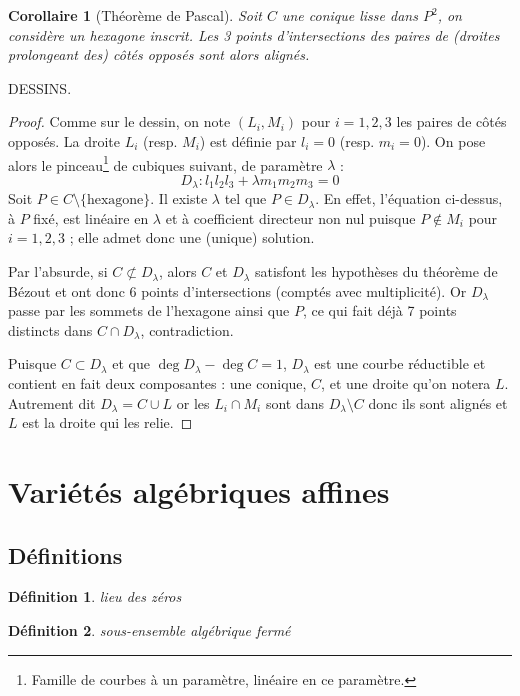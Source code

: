 \documentclass[a4paper, 11pt]{article}
\newtheorem{corollaire}[théorème]{Corollaire}
\theoremstyle{definition}
\newtheorem{définition}{Définition}
\begin{document}
\begin{corollaire}[Théorème de Pascal]
  Soit $C$ une conique lisse dans $P^2$, on considère un hexagone
  inscrit. Les 3 points d'intersections des paires de (droites
  prolongeant des) côtés opposés sont alors alignés.
\end{corollaire}
DESSINS.
\begin{proof}
  Comme sur le dessin, on note $(L_i, M_i)$ pour $i=1,2,3$ les paires
  de côtés opposés. La droite $L_i$ (resp. $M_i$) est définie par
  $l_i = 0$ (resp. $m_i = 0$). On pose alors le
  pinceau\footnote{Famille de courbes à un paramètre, linéaire en ce
    paramètre.} de cubiques suivant, de paramètre $\lambda$ :
  \[ D_{\lambda} : l_1 l_2 l_3 + \lambda m_1 m_2 m_3 = 0 \]
  Soit $P \in C\setminus\{\textrm{hexagone}\}$. Il existe
  $\lambda$ tel que $P \in D_{\lambda}$. En effet, l'équation
  ci-dessus, à $P$ fixé, est linéaire en $\lambda$ et à coefficient
  directeur non nul puisque $P \not\in M_i$ pour $i=1,2,3$ ; elle
  admet donc une (unique) solution.

  Par l'absurde, si $C \not\subset D_\lambda$, alors $C$ et
  $D_\lambda$ satisfont les hypothèses du théorème de Bézout et ont
  donc 6 points d'intersections (comptés avec multiplicité). Or
  $D_\lambda$ passe par les sommets de l'hexagone ainsi que $P$, ce
  qui fait déjà 7 points distincts dans $C \cap D_\lambda$,
  contradiction.

  Puisque $C \subset D_\lambda$ et que $\deg D_\lambda - \deg C = 1$,
  $D_\lambda$ est une courbe réductible et contient en fait deux
  composantes : une conique, $C$, et une droite qu'on notera $L$.
  Autrement dit $D_\lambda = C \cup L$ or les $L_i \cap M_i$ sont dans
  $D_\lambda \setminus C$ donc ils sont alignés et $L$ est la droite
  qui les relie.
\end{proof}

\section{Variétés algébriques affines}

\subsection{Définitions}

\begin{définition}
  \emph{lieu des zéros}
\end{définition}

\begin{définition}
  \emph{sous-ensemble algébrique fermé}
\end{définition}
\end{document}
